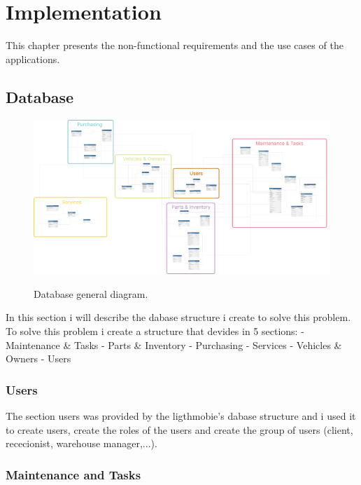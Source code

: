 \chapter{Implementation}%
\label{chapter:methodology}

\begin{introduction}
This chapter presents the non-functional requirements and the use cases of the applications. 
\end{introduction} 


\section{Database} 


\begin{figure}[h]
  \caption{Database general diagram.}
  \centering
  \includegraphics[width=\textwidth]{figs/dbDiagrams/DbDiagramFull}
  \label{fig:figure2} 
\end{figure}

In this section i will describe the dabase structure i create to solve this problem.
To solve this problem i create a structure that devides in 5 sections:
- Maintenance \& Tasks
- Parts \& Inventory 
- Purchasing
- Services
- Vehicles \& Owners
- Users
 

\subsection{Users} 

The section users was provided by the ligthmobie's dabase structure and i used it to create users, create the roles of the users and create the group of users (client, rececionist, warehouse manager,...).



\subsection{Maintenance and Tasks} 



